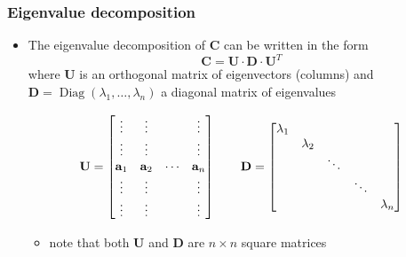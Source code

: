 \begin{frame}
  \frametitle{Eigenvalue decomposition}

  \begin{itemize}
  \item The eigenvalue decomposition of $\mathbf{C}$ can be written in the
    form
    \[
    \mathbf{C} = \mathbf{U}\cdot \mathbf{D}\cdot \mathbf{U}^T
    \]
    where $\mathbf{U}$ is an orthogonal matrix of eigenvectors (columns)
    and $\mathbf{D} = \mathop{\text{Diag}}(\lambda_1, \dots, \lambda_n)$ a diagonal
    matrix of eigenvalues
    \begin{small}
      \[
      \mathbf{U} =
      \begin{bmatrix}
        \vdots & \vdots & & \vdots \\
        \vdots & \vdots & & \vdots \\
        \va_1 & \va_2 & \cdots & \va_n \\
        \vdots & \vdots & & \vdots \\
        \vdots & \vdots & & \vdots
      \end{bmatrix}
      \qquad \mathbf{D} =
      \begin{bmatrix}
        \lambda_1 & & & \\
        & \lambda_2 & & & \\
        & & \ddots & & \\
        & & & \ddots & \\
        & & & & \lambda_n
      \end{bmatrix}
      \]
    \end{small}
    \begin{itemize}
    \item note that both $\mathbf{U}$ and $\mathbf{D}$ are $n\times n$ square matrices
    \end{itemize}
  \end{itemize}
\end{frame}

